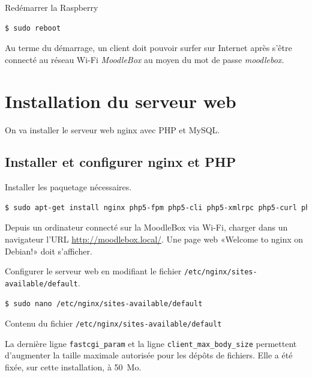 \documentclass[11pt]{article}
\begin{document}
Redémarrer la Raspberry

\begin{lstlisting}[language=bash]
$ sudo reboot
\end{lstlisting}

\begin{verification}
Au terme du démarrage, un client doit pouvoir surfer sur Internet après s'être connecté au réseau Wi-Fi \emph{MoodleBox} au moyen du mot de passe \emph{moodlebox}.
\end{verification}

\section{Installation du serveur web}

On va installer le serveur web nginx avec PHP et MySQL.

\subsection{Installer et configurer nginx et PHP}

Installer les paquetage nécessaires.

\begin{lstlisting}[language=bash]
$ sudo apt-get install nginx php5-fpm php5-cli php5-xmlrpc php5-curl php5-gd php5-intl
\end{lstlisting}

\begin{verification}
Depuis un ordinateur connecté sur la MoodleBox via Wi-Fi, charger dans un navigateur l'URL \url{http://moodlebox.local/}. Une page web «Welcome to nginx on Debian!» doit s'afficher.
\end{verification}

Configurer le serveur web en modifiant le fichier \lstinline{/etc/nginx/sites-available/default}.

\begin{lstlisting}[language=bash]
$ sudo nano /etc/nginx/sites-available/default
\end{lstlisting}

Contenu du fichier \lstinline{/etc/nginx/sites-available/default}



La dernière ligne \lstinline{fastcgi_param} et la ligne \lstinline{client_max_body_size} permettent d'augmenter la taille maximale autorisée pour les dépôts de fichiers. Elle a été fixée, sur cette installation, à 50~Mo.
\end{document}
